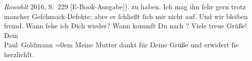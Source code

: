 \begin{ledgroupsized}[t]{13cm}
{{{                        \emph{Rowohlt}{ }2016, S. 229 [E-Book-Ausgabe]).}}}\label{K_L02911-11h} zu
               haben. Ich mag ihn ſehr gern trotz mancher Geſchmack-Defekte; aber er ſchließt ſich
               mir nicht auf. {\pb}Und wir bleiben fremd.\pend
           \pstart
           Wann ſehe ich Dich wieder? Wann kommſt Du nach \label{K_L02911-12v}\label{K_L02911-12h}?\pend
           \pstart
           Viele treue Grüße! {\\[\baselineskip]}Dein {\\[\baselineskip]}\spacefill\mbox{Paul Goldmann}\pend
           \leftskip=0em{}\pstart
           \noindent{}Meine Mutter dankt für
                  Deine Grüße und erwidert ſie herzlichſt.\pend
           
         
         \endnumbering{}\end{ledgroupsized}  \newcommand{\dateiname}{L02911}\newcommand{\titel}{Paul Goldmann an Arthur Schnitzler, 18. 4. [1900]}\newcommand{\editorInnen}{Martin Anton Müller und Laura Untner}
      